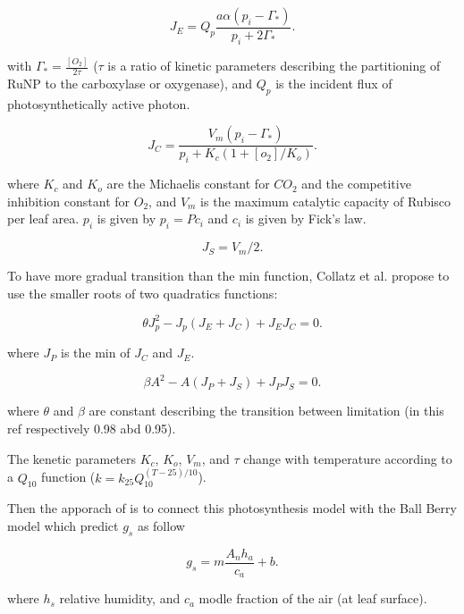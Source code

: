 \documentclass[a4paper,11pt]{article}
\begin{document}
\begin{equation}
\label{eq:JC}
J_E = Q_p \frac{a \alpha (p_i - \Gamma_*)}{p_i + 2 \Gamma_*}.
\end{equation}

with $\Gamma_* = \frac{[O_2]}{2\tau}$ ($\tau$ is a ratio of kinetic parameters describing the partitioning of RuNP to the carboxylase or oxygenase), and $Q_p$ is the incident flux of photosynthetically active photon.

\begin{equation}
\label{eq:JE}
J_C= \frac{V_m (p_i - \Gamma_*)}{p_i + K_c (1+[o_2]/K_o)}.
\end{equation}

where $K_c$ and $K_o$ are the Michaelis constant for $CO_2$ and the competitive inhibition constant for $O_2$, and $V_m$ is the maximum catalytic capacity of Rubisco per leaf area.
$p_i$ is given by $p_i = P c_i$ and $c_i$ is given by Fick's law.

\begin{equation}
\label{eq:JS}
J_S= V_m/2.
\end{equation}

To have more gradual transition than the min function, Collatz et al. propose to use the smaller roots of two quadratics functions:

\begin{equation}
\label{eq:Q1}
\theta J_p^2 - J_p(J_E+J_C) + J_E J_C= 0.
\end{equation}

where $J_P$ is the min of $J_C$ and $J_E$.

\begin{equation}
\label{eq:Q2}
\beta A^2 - A(J_P+J_S) + J_P J_S= 0.
\end{equation}

where $\theta$ and $\beta$ are constant describing the transition between limitation (in this ref respectively 0.98 abd 0.95).

The kenetic parameters $K_c$, $K_o$, $V_m$, and $\tau$ change with temperature according to a $Q_{10}$ function ($k = k_{25} Q_{10}^{(T-25)/10}$).

Then the apporach of \citet{Collatz-1991} is to connect this photosynthesis model with the Ball Berry model which predict $g_s$  as follow

\begin{equation}
\label{eq:gs}
g_s= m \frac{A_n h_a}{c_a}+b.
\end{equation}

where $h_s$ relative humidity, and $c_a$ modle fraction of the air (at leaf surface).
\end{document}
